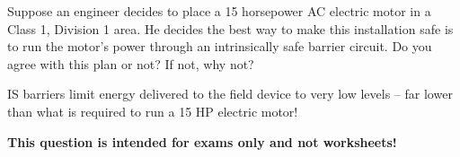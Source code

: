 

Suppose an engineer decides to place a 15 horsepower AC electric motor in a Class 1, Division 1 area.  He decides the best way to make this installation safe is to run the motor's power through an intrinsically safe barrier circuit.  Do you agree with this plan or not?  If not, why not?







IS barriers limit energy delivered to the field device to very low levels -- far lower than what is required to run a 15 HP electric motor!  







{\bf This question is intended for exams only and not worksheets!}



